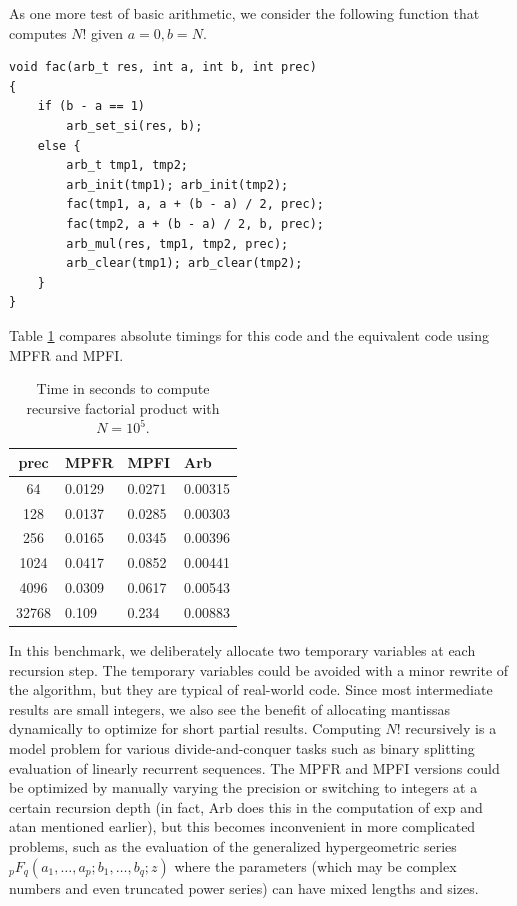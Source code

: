 \documentclass[10pt,journal,compsoc,cspaper]{IEEEtran}
\begin{document}
As one more test of basic arithmetic, we consider
the following function that computes $N!$ given $a=0, b=N$.

\begin{verbatim}
void fac(arb_t res, int a, int b, int prec)
{
    if (b - a == 1)
        arb_set_si(res, b);
    else {
        arb_t tmp1, tmp2;
        arb_init(tmp1); arb_init(tmp2);
        fac(tmp1, a, a + (b - a) / 2, prec);
        fac(tmp2, a + (b - a) / 2, b, prec);
        arb_mul(res, tmp1, tmp2, prec);
        arb_clear(tmp1); arb_clear(tmp2);
    }
}
\end{verbatim}

Table \ref{tab:timingsfact} compares absolute timings for
this code and the equivalent code using MPFR and MPFI.

\begin{table}[!ht]
\caption{Time in seconds to compute recursive factorial product with $N = 10^5$.}
\label{tab:timingsfact}
\begin{center}
\renewcommand{\arraystretch}{1.2}
\begin{tabular}{c|l|l|l}
prec  &  MPFR  &  MPFI & Arb \\ \hline
64    &  0.0129 &  0.0271 & 0.00315 \\
128   &  0.0137 &  0.0285 & 0.00303 \\
256   &  0.0165 &  0.0345 & 0.00396 \\
1024  &  0.0417 &  0.0852 & 0.00441 \\
4096  &  0.0309 &  0.0617 & 0.00543 \\
32768 &  0.109 &   0.234  & 0.00883 \\
\end{tabular}
\end{center}
\end{table}

In this benchmark, we deliberately allocate two
temporary variables at each recursion step.
The temporary variables could be avoided with a minor rewrite
of the algorithm,
but they are typical of real-world code.
Since most intermediate results are small integers, we also
see the benefit of allocating mantissas dynamically to optimize for
short partial results.
Computing $N!$ recursively is a model problem for various
divide-and-conquer tasks such as binary splitting evaluation
of linearly recurrent sequences.
The MPFR and MPFI versions could be optimized by
manually varying the precision or switching to integers at a certain
recursion depth (in fact, Arb does this in the computation of exp and atan
mentioned earlier), but this becomes inconvenient in more complicated problems,
such as the evaluation of the generalized hypergeometric series
${}_pF_q(a_1,\ldots,a_p; b_1,\ldots,b_q; z)$ where the parameters
(which may be complex numbers and even truncated power series)
can have mixed lengths and sizes.
\end{document}
